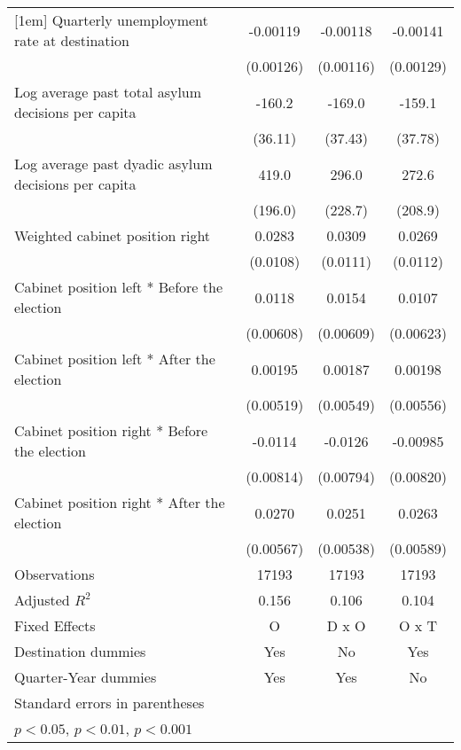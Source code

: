\begin{table}[htbp]
\begin{tabular}{l*{3}{c}}
[1em]
Quarterly unemployment rate at destination&    -0.00119         &    -0.00118         &    -0.00141         \\
                    &   (0.00126)         &   (0.00116)         &   (0.00129)         \\
[1em]
Log average past total asylum decisions per capita&      -160.2\sym{***}&      -169.0\sym{***}&      -159.1\sym{***}\\
                    &     (36.11)         &     (37.43)         &     (37.78)         \\
[1em]
Log average past dyadic asylum decisions per capita&       419.0\sym{*}  &       296.0         &       272.6         \\
                    &     (196.0)         &     (228.7)         &     (208.9)         \\
[1em]
Weighted cabinet position right&      0.0283\sym{*}  &      0.0309\sym{**} &      0.0269\sym{*}  \\
                    &    (0.0108)         &    (0.0111)         &    (0.0112)         \\
[1em]
Cabinet position left * Before the election&      0.0118         &      0.0154\sym{*}  &      0.0107         \\
                    &   (0.00608)         &   (0.00609)         &   (0.00623)         \\
[1em]
Cabinet position left * After the election&     0.00195         &     0.00187         &     0.00198         \\
                    &   (0.00519)         &   (0.00549)         &   (0.00556)         \\
[1em]
Cabinet position right * Before the election&     -0.0114         &     -0.0126         &    -0.00985         \\
                    &   (0.00814)         &   (0.00794)         &   (0.00820)         \\
[1em]
Cabinet position right * After the election&      0.0270\sym{***}&      0.0251\sym{***}&      0.0263\sym{***}\\
                    &   (0.00567)         &   (0.00538)         &   (0.00589)         \\
\hline
Observations        &       17193         &       17193         &       17193         \\
Adjusted \(R^{2}\)  &       0.156         &       0.106         &       0.104         \\
Fixed Effects       &           O         &       D x O         &       O x T         \\
Destination dummies &         Yes         &          No         &         Yes         \\
Quarter-Year dummies&         Yes         &         Yes         &          No         \\
\hline\hline
\multicolumn{4}{l}{\footnotesize Standard errors in parentheses}\\
\multicolumn{4}{l}{\footnotesize \sym{*} \(p<0.05\), \sym{**} \(p<0.01\), \sym{***} \(p<0.001\)}\\
\end{tabular}
\end{table}
